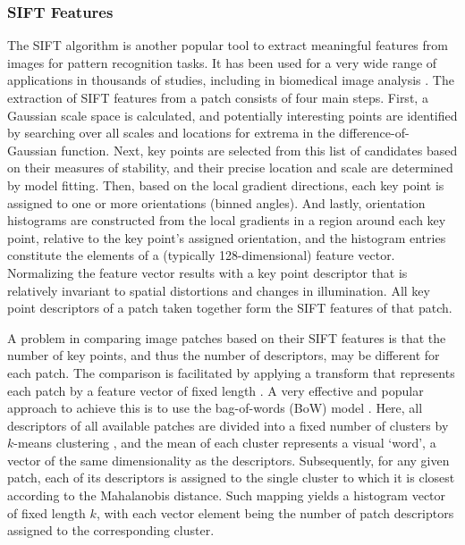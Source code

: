 \subsubsection{SIFT Features}
\label{subsubsec:sift-and-bow}
The SIFT algorithm \cite{lowe2004distinctive} is another popular tool to extract meaningful features from images for pattern recognition tasks. It has been used for a very wide range of applications in thousands of studies, including in biomedical image analysis \cite{ni2009reconstruction, jiang2010live, mualla2013automatic, zhang2013nonrigid, ni2009reconstruction, yu2016fast}. The extraction of SIFT features from a patch consists of four main steps. First, a Gaussian scale space is calculated, and potentially interesting points are identified by searching over all scales and locations for extrema in the difference-of-Gaussian function. Next, key points are selected from this list of candidates based on their measures of stability, and their precise location and scale are determined by model fitting. Then, based on the local gradient directions, each key point is assigned to one or more orientations (binned angles). And lastly, orientation histograms are constructed from the local gradients in a region around each key point, relative to the key point's assigned orientation, and the histogram entries constitute the elements of a (typically 128-dimensional) feature vector. Normalizing the feature vector results with a key point descriptor that is relatively invariant to spatial distortions and changes in illumination. All key point descriptors of a patch taken together form the SIFT features of that patch.

A problem in comparing image patches based on their SIFT features is that the number of key points, and thus the number of descriptors, may be different for each patch. The comparison is facilitated by applying a transform that represents each patch by a feature vector of fixed length \cite{yang2009linear}. A very effective and popular approach to achieve this is to use the bag-of-words (BoW) model \cite{fei2005bayesian}. Here, all descriptors of all available patches are divided into a fixed number of clusters by $k$-means clustering \cite{macqueen1967some}, and the mean of each cluster represents a visual `word', a vector of the same dimensionality as the descriptors. Subsequently, for any given patch, each of its descriptors is assigned to the single cluster to which it is closest according to the Mahalanobis distance. Such mapping yields a histogram vector of fixed length $k$, with each vector element being the number of patch descriptors assigned to the corresponding cluster.

